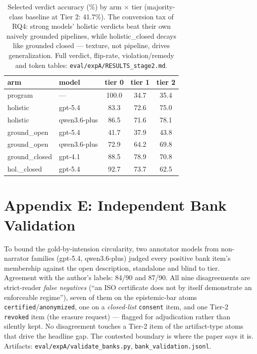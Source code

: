 \begin{table}[h]
\centering
\small
\begin{tabular}{llccc}
\toprule
arm & model & tier 0 & tier 1 & tier 2 \\
\midrule
program  & ---     & 100.0 & 34.7 & 35.4 \\
holistic & gpt-5.4 & 83.3 & 72.6 & 75.0 \\
holistic & qwen3.6-plus & 86.5 & 71.6 & 78.1 \\
ground\_open & gpt-5.4 & 41.7 & 37.9 & 43.8 \\
ground\_open & qwen3.6-plus & 72.9 & 64.2 & 69.8 \\
ground\_closed & gpt-4.1 & 88.5 & 78.9 & 70.8 \\
hol.\_closed & gpt-5.4 & 92.7 & 73.7 & 62.5 \\
\bottomrule
\end{tabular}
\caption{Selected verdict accuracy (\%) by arm $\times$ tier (majority-class
baseline at Tier 2: 41.7\%). The conversion tax of RQ4: strong models'
holistic verdicts beat their own naively grounded pipelines, while
holistic\_closed decays like grounded closed --- texture, not pipeline,
drives generalization. Full verdict, flip-rate, violation/remedy and token
tables: \texttt{eval/expA/RESULTS\_stage2.md}.}
\label{tab:verdict}
\end{table}

\section{Appendix E: Independent Bank Validation}

To bound the gold-by-intension circularity, two annotator models from
non-narrator families (gpt-5.4, qwen3.6-plus) judged every positive bank
item's membership against the open description, standalone and blind to
tier. Agreement with the author's labels: 84/90 and 87/90. All nine
disagreements are strict-reader \emph{false negatives} (``an ISO certificate
does not by itself demonstrate an enforceable regime''), seven of them on the
epistemic-bar atoms \texttt{certified}/\texttt{anonymized}, one on a
\emph{closed-list} \texttt{consent} item, and one Tier-2 \texttt{revoked}
item (the erasure request) --- flagged for adjudication rather than silently
kept. No disagreement touches a Tier-2 item of the artifact-type atoms that
drive the headline gap. The contested boundary is where the paper says it
is. Artifacts: \texttt{eval/expA/validate\_banks.py},
\texttt{bank\_validation.jsonl}.

